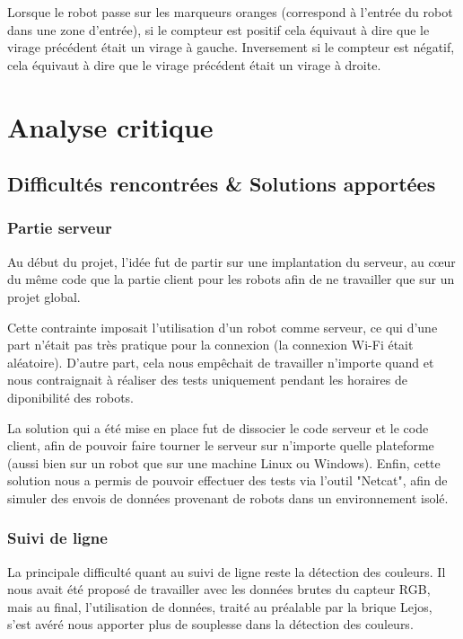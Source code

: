 \documentclass[french,a4paper,12pt]{report}
\begin{document}
Lorsque le robot passe sur les marqueurs oranges (correspond à l’entrée du robot dans une zone d’entrée), si le compteur est positif cela équivaut à dire que le virage précédent était un virage à gauche. Inversement si le compteur est négatif, cela équivaut à dire que le virage précédent était un virage à droite.

\part{Analyse critique}

\chapter{Difficultés rencontrées \& Solutions apportées}

\section{Partie serveur}
Au début du projet, l’idée fut de partir sur une implantation du serveur, au cœur du même code que la partie client pour les robots afin de ne travailler que sur un projet global.

Cette contrainte imposait l’utilisation d'un robot comme serveur, ce qui d’une part n’était pas très pratique pour la connexion (la connexion Wi-Fi était aléatoire).
D’autre part, cela nous empêchait de travailler n'importe quand et nous contraignait à réaliser des tests uniquement pendant les horaires de diponibilité des robots.

La solution qui a été mise en place fut de dissocier le code serveur et le code client, afin de pouvoir faire tourner le serveur sur n’importe quelle plateforme (aussi bien sur un robot que sur une machine Linux ou Windows).
Enfin, cette solution nous a permis de pouvoir effectuer des tests via l'outil "Netcat", afin de simuler des envois de données provenant de robots dans un environnement isolé.

\section{Suivi de ligne}
La principale difficulté quant au suivi de ligne reste la détection des couleurs. Il nous avait été proposé de travailler avec les données brutes du capteur RGB, mais au final, l'utilisation de données, traité au préalable par la brique Lejos, s'est avéré nous apporter plus de souplesse dans la détection des couleurs.
\newpage
\end{document}
